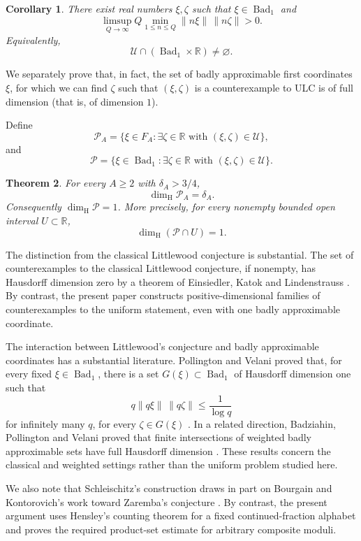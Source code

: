\documentclass[11pt]{amsart}
\newtheorem{theorem}{Theorem}[section]
\newtheorem{corollary}[theorem]{Corollary}
\newcommand{\R}{\mathbb R}
\newcommand{\Bad}{\operatorname{Bad}}
\newcommand{\dimH}{\dim_{\mathrm H}}
\newcommand{\cP}{\mathcal P}
\begin{document}
\begin{corollary}\label{cor:main}
There exist real numbers $\xi,\zeta$ such that $\xi\in\Bad_1$ and
\begin{equation}\label{eq:mainlimsup}
 \limsup_{Q\to\infty} Q\min_{1\le n\le Q}\|n\xi\|\,\|n\zeta\|>0.
\end{equation}
Equivalently,
$$
 \mathcal U\cap(\Bad_1\times\R)\ne\varnothing.
$$
\end{corollary}

We separately prove that, in fact, the set of badly approximable first coordinates $\xi$, for which we can find $\zeta$ such that $(\xi,\zeta)$ is a counterexample to ULC is of full dimension (that is, of dimension $1$).

Define
$$
 \cP_A=\{\xi\in F_A:\exists\zeta\in\R\text{ with }(\xi,\zeta)\in \mathcal U\},
$$
and
$$
 \cP=\{\xi\in\Bad_1:\exists\zeta\in\R\text{ with }(\xi,\zeta)\in \mathcal U\}.
$$

\begin{theorem}\label{thm:first-dim}
For every $A\ge2$ with $\delta_A>3/4$,
$$
 \dimH\cP_A=\delta_A.
$$
Consequently $\dimH\cP=1$.  More precisely, for every nonempty bounded open
interval $U\subset\R$,
$$
 \dimH(\cP\cap U)=1.
$$
\end{theorem}



The distinction from the classical Littlewood conjecture is substantial.  The
set of counterexamples to the classical Littlewood conjecture, if nonempty,
has Hausdorff dimension zero by a theorem of Einsiedler, Katok and
Lindenstrauss \cite{EinsiedlerKatokLindenstrauss}.  By contrast, the present
paper constructs positive-dimensional families of counterexamples to the
uniform statement, even with one badly approximable coordinate.

The interaction between Littlewood's conjecture and badly approximable
coordinates has a substantial literature.  Pollington and Velani proved that,
for every fixed $\xi\in\Bad_1$, there is a set $G(\xi)\subset\Bad_1$ of
Hausdorff dimension one such that
$$
 q\|q\xi\|\,\|q\zeta\|\le \frac{1}{\log q}
$$
for infinitely many $q$, for every $\zeta\in G(\xi)$
\cite{PollingtonVelaniLittlewood}.  In a related direction, Badziahin,
Pollington and Velani proved that finite intersections of weighted badly
approximable sets have full Hausdorff dimension
\cite{BadziahinPollingtonVelani}.  These results concern the classical and
weighted settings rather than the uniform problem studied here.

We also note that Schleischitz's construction draws in part on Bourgain and Kontorovich's work
toward Zaremba's conjecture \cite{BourgainKontorovich}.  By contrast, the
present argument uses Hensley's counting theorem for a fixed continued-fraction
alphabet and proves the required product-set estimate for arbitrary composite
moduli.
\end{document}
